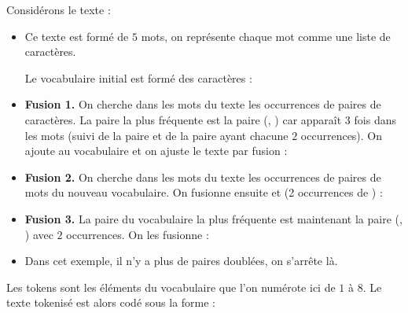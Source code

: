 \documentclass[11pt,class=report,crop=false]{standalone}
\begin{document}
\begin{exemple}
Considérons le texte : 
\begin{itemize}
	\item Ce texte est formé de $5$ mots, on représente chaque mot comme une liste de caractères.
	

Le vocabulaire initial est formé des caractères :

\item \textbf{Fusion 1.}
On cherche dans les mots du texte les occurrences de paires de caractères.
La paire la plus fréquente est la paire (, ) car  apparaît $3$ fois dans les mots (suivi de la paire  et de la paire  ayant chacune $2$ occurrences).
On ajoute  au vocabulaire et on ajuste le texte par fusion :



\item  \textbf{Fusion 2.}
On cherche dans les mots du texte les occurrences de paires de mots du nouveau vocabulaire. On fusionne ensuite  et  
(2 occurrences de ) :



\item  \textbf{Fusion 3.}
La paire du vocabulaire la plus fréquente est maintenant la paire
(, ) avec $2$ occurrences. On les fusionne :



\item Dans cet exemple, il n'y a plus de paires doublées, on s'arrête là.

\end{itemize}

Les tokens sont les éléments du vocabulaire que l'on numérote ici de $1$ à $8$.
Le texte tokenisé est alors codé sous la forme :

\end{exemple}
\end{document}

